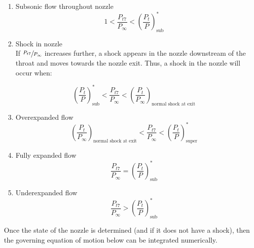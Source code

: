 \documentclass{article}
\begin{document}
\begin{enumerate}
\item Subsonic flow throughout nozzle \\ 

\begin{equation*}
1 < \frac{P_{t7}}{P_{\infty}} < \left( \frac{P_t}{P} \right)_{\textrm{sub}}^*
\end{equation*}

\item Shock in nozzle \\ 

If $\sfrac{P_{t7}}{P_{\infty}}$ increases further, a shock appears in the nozzle downstream of the throat and moves towards the nozzle exit. Thus, a shock in the nozzle will occur when:

\begin{equation*}
\left( \frac{P_t}{P} \right)_{\textrm{sub}}^* < \frac{P_{t7}}{P_{\infty}} < \left( \frac{P_t}{P_{\infty}} \right)_{\textrm{normal shock at exit}}
\end{equation*}

\item Overexpanded flow \\

\begin{equation*}
\left( \frac{P_t}{P_{\infty}} \right)_{\textrm{normal shock at exit}} < \frac{P_{t7}}{P_{\infty}} < \left( \frac{P_t}{P} \right)_{\textrm{super}}^*
\end{equation*}

\item Fully expanded flow \\

\begin{equation*}
\frac{P_{t7}}{P_{\infty}} = \left( \frac{P_t}{P} \right)_{\textrm{sub}}^*
\end{equation*}

\item Underexpanded flow \\

\begin{equation*}
\frac{P_{t7}}{P_{\infty}} > \left( \frac{P_t}{P} \right)_{\textrm{sub}}^*
\end{equation*}

\end{enumerate}

Once the state of the nozzle is determined (and if it does not have a shock), then the governing equation of motion below can be integrated numerically.
\end{document}
